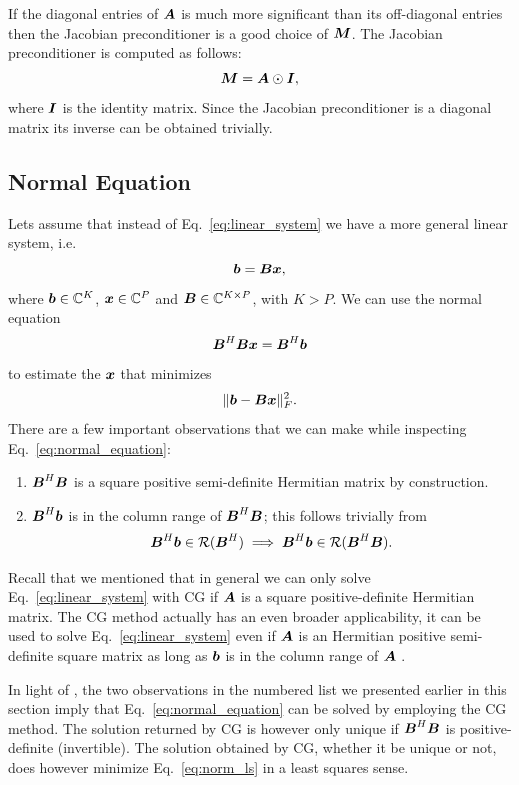 \documentclass[useAMS,usenatbib]{mn2e}
\newcommand{\bA}{\bmath{A}}
\newcommand{\bB}{\bmath{B}}
\newcommand{\bM}{\bmath{M}}
\newcommand{\bI}{\bmath{I}}
\newcommand{\bb}{\bmath{b}}
\newcommand{\bx}{\bmath{x}}
\begin{document}
If the diagonal entries of $\bA$ is much more significant than its off-diagonal entries then the 
Jacobian preconditioner is a good choice of $\bM$. The Jacobian preconditioner is computed as follows:
\begin{equation}
\bM = \bA\odot\bI, 
\end{equation}
where $\bI$ is the identity matrix. Since the Jacobian preconditioner is a diagonal matrix its inverse can be obtained trivially.

\subsection{Normal Equation}
Lets assume that instead of Eq.~\eqref{eq:linear_system} we have a more general linear system, i.e.
\begin{equation}
 \bb = \bB\bx,
\end{equation}
where $\bb\in\mathbb{C}^K$, $\bx\in\mathbb{C}^P$  and $\bB\in\mathbb{C}^{K \times P}$, with $K > P$. We can use the normal equation 
\begin{equation}
\label{eq:normal_equation}
\bB^H\bB\bx = \bB^H\bb 
\end{equation}
to estimate the $\bx$ that minimizes
\begin{equation}
\label{eq:norm_ls}
\|\bb-\bB\bx\|_F^2. 
\end{equation}
There are a few important observations that we can make while inspecting Eq.~\eqref{eq:normal_equation}:
\begin{enumerate}
\item $\bB^H\bB$ is a square positive semi-definite Hermitian matrix by construction.
\item $\bB^H\bb$ is in the column range of $\bB^H\bB$; this follows trivially from 
\begin{equation}
\bB^H\bb \in \mathcal{R}(\bB^H) \implies \bB^H\bb \in \mathcal{R}(\bB^H\bB).   
\end{equation}
\end{enumerate}

Recall that we mentioned that in general we can only solve Eq.~\eqref{eq:linear_system} with CG if $\bA$ is a square positive-definite Hermitian matrix. The CG method actually has an even broader applicability, it can be used to solve Eq.~\eqref{eq:linear_system} even if $\bA$ is an Hermitian positive semi-definite
square matrix as long as $\bb$ is in the column range of $\bA$ \citep{Lu2015}.

In light of \citet{Lu2015}, the two observations in the numbered list we presented earlier in this section imply that Eq.~\eqref{eq:normal_equation}
can be solved by employing the CG method. The solution returned by CG is however only unique if $\bB^H\bB$ is positive-definite (invertible). The solution
obtained by CG, whether it be unique or not, does however minimize Eq.~\eqref{eq:norm_ls} in a least squares sense.
\end{document}
